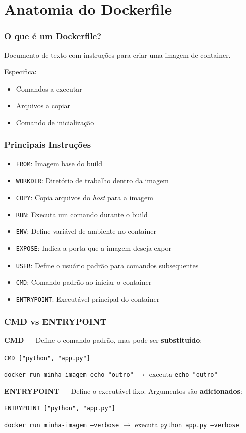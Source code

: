 \section{Anatomia do Dockerfile}

\begin{frame}
  \frametitle{O que é um Dockerfile?}
  Documento de texto com instruções para criar uma imagem de container.

  \vspace{0.5em}
  Especifica:
  \begin{itemize}
    \item Comandos a executar
    \item Arquivos a copiar
    \item Comando de inicialização
  \end{itemize}
\end{frame}

\begin{frame}
  \frametitle{Principais Instruções}
  \begin{itemize}
    \item \texttt{FROM}: Imagem base do build
    \item \texttt{WORKDIR}: Diretório de trabalho dentro da imagem
    \item \texttt{COPY}: Copia arquivos do \textit{host} para a imagem
    \item \texttt{RUN}: Executa um comando durante o build
    \item \texttt{ENV}: Define variável de ambiente no container
    \item \texttt{EXPOSE}: Indica a porta que a imagem deseja expor
    \item \texttt{USER}: Define o usuário padrão para comandos subsequentes
    \item \texttt{CMD}: Comando padrão ao iniciar o container
    \item \texttt{ENTRYPOINT}: Executável principal do container
  \end{itemize}
\end{frame}

\begin{frame}
  \frametitle{CMD vs ENTRYPOINT}
  \textbf{CMD} — Define o comando padrão, mas pode ser \textbf{substituído}:

  \vspace{0.3em}
  \small
  \texttt{CMD ["python", "app.py"]}

  \texttt{docker run minha-imagem echo "outro"} $\rightarrow$ executa \texttt{echo "outro"}

  \vspace{0.8em}
  \normalsize
  \textbf{ENTRYPOINT} — Define o executável fixo. Argumentos são \textbf{adicionados}:

  \vspace{0.3em}
  \small
  \texttt{ENTRYPOINT ["python", "app.py"]}

  \texttt{docker run minha-imagem --verbose} $\rightarrow$ executa \texttt{python app.py --verbose}
\end{frame}

